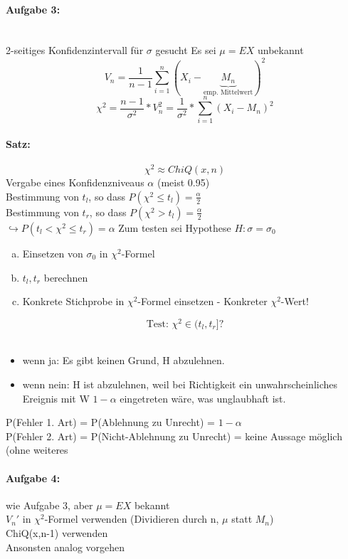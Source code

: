 \documentclass[a4paper,12pt]{scrartcl}
\begin{document}
  \paragraph{Aufgabe 3:}\quad\\
  2-seitiges Konfidenzintervall für $\sigma$ gesucht
  Es sei $\mu = EX$ unbekannt
  $$V_n = \frac{1}{n-1}\sum_{i=1}^n(X_i-\underbrace{M_n}_{\text{emp. Mittelwert}})^2 $$
  $$\chi^2 = \frac{n-1}{\sigma^2}*V_n^2 = \frac{1}{\sigma^2}*\sum_{i=1}^n(X_i-M_n)^2 $$
  \paragraph{Satz:}
  $$\chi^2\approx ChiQ(x,n)$$
  Vergabe eines Konfidenzniveaus $\alpha$ (meist 0.95)\\
  Bestimmung von $t_l$, so dass $P(\chi^2\leq t_l) = \frac{\alpha}{2}$\\
  Bestimmung von $t_r$, so dass $P(\chi^2 > t_l) = \frac{\alpha}{2}$\\
  $\hookrightarrow P(t_l<\chi^2\leq t_r) = \alpha$
  Zum testen sei Hypothese $H:\sigma = \sigma_0$
  \begin{enumerate}[(a)]
   \item Einsetzen von $\sigma_0$ in $\chi^2$-Formel
   \item $t_l,t_r$ berechnen
   \item Konkrete Stichprobe in $\chi^2$-Formel einsetzen - Konkreter $\chi^2$-Wert!\\
  \end{enumerate}
    $$\text{Test: }\chi^2\in(t_l,t_r]?$$\\
    \begin{itemize}
      \item wenn ja: Es gibt keinen Grund, H abzulehnen.
      \item wenn nein: H ist abzulehnen, weil bei Richtigkeit ein unwahrscheinliches Ereignis mit W $1-\alpha$ eingetreten wäre, was unglaubhaft ist.
    \end{itemize}
   P(Fehler 1. Art) = P(Ablehnung zu Unrecht) = $1-\alpha$\\
   P(Fehler 2. Art) = P(Nicht-Ablehnung zu Unrecht) = keine Aussage möglich (ohne weiteres
   
  \paragraph{Aufgabe 4:} wie Aufgabe 3, aber $\mu = EX$ bekannt\\
  $V_n'$ in $\chi^2$-Formel verwenden (Dividieren durch n, $\mu$ statt $M_n$)\\
  ChiQ(x,n-1) verwenden\\
  Ansonsten analog vorgehen
  
\end{document}
